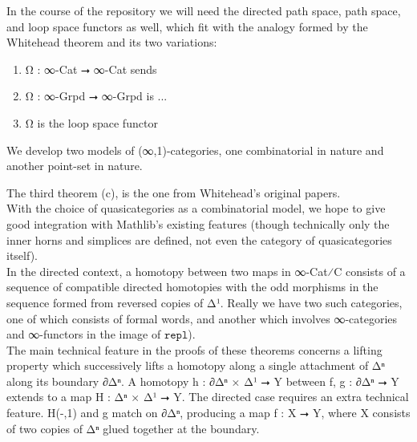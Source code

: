 \documentclass{book}
\theoremstyle{definition}
\begin{document}
In the course of the repository we will need the directed path space, path space, and loop space functors as well, which fit with the analogy formed by the Whitehead theorem and its two variations:

\begin{enumerate}
\item Ω⃗ : ∞-Cat ⭢ ∞-Cat sends 
\item Ω⃡ : ∞-Grpd ⭢ ∞-Grpd is ...
\item Ω is the loop space functor
\end{enumerate}

We develop two models of (∞,1)-categories, one combinatorial in nature and another point-set in nature. 

The third theorem (c), is the one from Whitehead's original papers.\\

With the choice of quasicategories as a combinatorial model, we hope to give good integration with Mathlib's existing features (though technically only the inner horns and simplices are defined, not even the category of quasicategories itself).\\

In the directed context, a homotopy between two maps in ∞-Cat⁄C consists of a sequence of compatible directed homotopies with the odd morphisms in the sequence formed from reversed copies of Δ¹. Really we have two such categories, one of which consists of formal words, and another which involves ∞-categories and ∞-functors in the image of $\texttt{repl}$).\\

The main technical feature in the proofs of these theorems concerns a lifting property which successively lifts a homotopy along a single attachment of Δⁿ along its boundary ∂Δⁿ. A homotopy h : ∂Δⁿ × Δ¹ ⭢ Y between f, g : ∂Δⁿ ⭢ Y extends to a map H : Δⁿ × Δ¹ ⭢ Y. The directed case requires an extra technical feature. H(-,1) and g match on ∂Δⁿ, producing a map f : X ⭢ Y, where X consists of two copies of Δⁿ glued together at the boundary.\\
\end{document}
